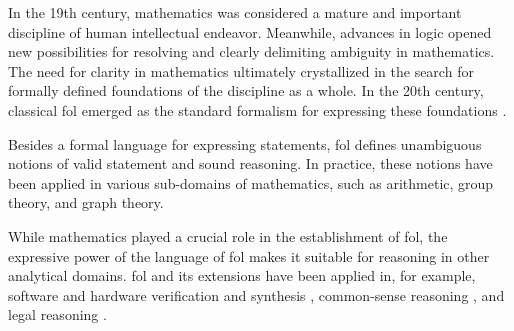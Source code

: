 
In the 19th century, mathematics was considered a mature and important discipline of human intellectual endeavor.
Meanwhile,
advances in logic opened new possibilities
for resolving
and clearly delimiting ambiguity in mathematics.
The need for clarity in mathematics
ultimately crystallized in the search for formally defined foundations of the discipline as a whole.
In the 20th century,
classical \gls{fol} emerged as the standard formalism for expressing these foundations \cite{DBLP:journals/bsl/Ferreiros01}.


Besides a formal language for expressing statements,
\gls{fol} defines unambiguous notions of valid statement and sound reasoning.
In practice, these notions have been applied in various sub-domains of mathematics, such as arithmetic, group theory, and graph theory.

While mathematics played a crucial role in the establishment of \gls{fol},
the expressive power of the language of \gls{fol} makes it suitable for reasoning in other analytical domains.
\Gls{fol} and its extensions have been applied in, for example, software and hardware verification and synthesis
\cite{
DBLP:journals/tcad/DSilvaKW08, %
DBLP:series/lncs/10001}, %
common-sense reasoning \cite{}, and
legal reasoning \cite{DBLP:journals/logcom/PrakkenWBA15,
DBLP:conf/atal/LibalN21}.

